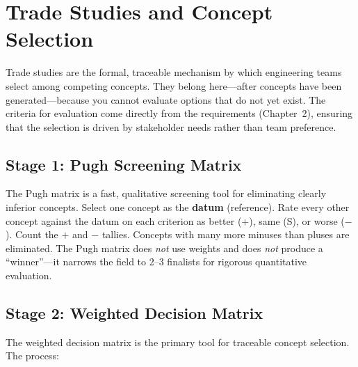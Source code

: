 \documentclass[11pt,letterpaper,twoside,openany]{book}
\begin{document}
\FloatBarrier
\section{Trade Studies and Concept Selection}

Trade studies are the formal, traceable mechanism by which engineering teams select among competing concepts. They belong here---after concepts have been generated---because you cannot evaluate options that do not yet exist. The criteria for evaluation come directly from the requirements (Chapter~2), ensuring that the selection is driven by stakeholder needs rather than team preference.

\subsection{Stage 1: Pugh Screening Matrix}
The Pugh matrix is a fast, qualitative screening tool for eliminating clearly inferior concepts. Select one concept as the \textbf{datum} (reference). Rate every other concept against the datum on each criterion as better ($+$), same (S), or worse ($-$). Count the $+$ and $-$ tallies. Concepts with many more minuses than pluses are eliminated. The Pugh matrix does \emph{not} use weights and does \emph{not} produce a ``winner''---it narrows the field to 2--3 finalists for rigorous quantitative evaluation.

\subsection{Stage 2: Weighted Decision Matrix}
The weighted decision matrix is the primary tool for traceable concept selection. The process:
\end{document}
